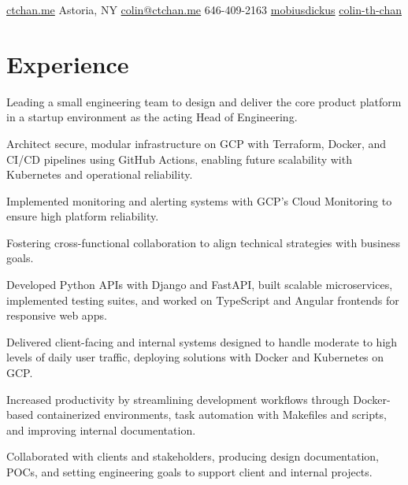 \documentclass[]{plushcv}
\begin{document}
%
%
{
  \contactline
  {\href{https://ctchan.me}{ctchan.me}}
  {Astoria, NY}
  {\href{mailto:colin@ctchan.me}{colin@ctchan.me}}
  {646-409-2163}
  {\href{https://www.github.com/mobiusdickus}{mobiusdickus}}
  {\href{https://www.linkedin.com/in/colin-th-chan/}{colin-th-chan}}
}

%
%

\begin{minipage}[t]{0.70\textwidth} 



\section{Experience}
\vspace{\topsep} %
\begin{tightemize}
\sectionsep
\item Leading a small engineering team to design and deliver the core product platform in a startup environment as the acting Head of Engineering.
\item Architect secure, modular infrastructure on GCP with Terraform, Docker, and CI/CD pipelines using GitHub Actions, enabling future scalability with Kubernetes and operational reliability.
\item Implemented monitoring and alerting systems with GCP's Cloud Monitoring to ensure high platform reliability.
\item Fostering cross-functional collaboration to align technical strategies with business goals.
\end{tightemize}
\sectionsep

\begin{tightemize}
\sectionsep
\item Developed Python APIs with Django and FastAPI, built scalable microservices, implemented testing suites, and worked on TypeScript and Angular frontends for responsive web apps.
\item Delivered client-facing and internal systems designed to handle moderate to high levels of daily user traffic, deploying solutions with Docker and Kubernetes on GCP.
\item Increased productivity by streamlining development workflows through Docker-based containerized environments, task automation with Makefiles and scripts, and improving internal documentation.
\item Collaborated with clients and stakeholders, producing design documentation, POCs, and setting engineering goals to support client and internal projects.
\end{tightemize}
\sectionsep


\end{minipage}
\end{document}
